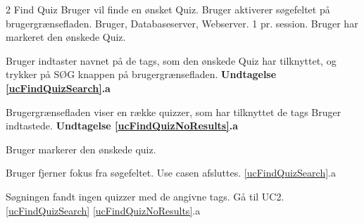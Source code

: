 \uchead
	{2}
	{Find Quiz}
	{Bruger vil finde en ønsket Quiz.}
	{Bruger aktiverer søgefeltet på brugergrænsefladen.}
	{Bruger, Databaseserver, Webserver.}
	{}
	{1 pr. session.}
	{Bruger har markeret den ønskede Quiz.}

\item \label{ucFindQuizSearch} Bruger indtaster navnet på de tags, som den ønskede Quiz har tilknyttet, og trykker på SØG knappen på brugergrænsefladen. 
\textbf{Undtagelse \ref{ucFindQuizSearch}.a}

\item \label{ucFindQuizNoResults} Brugergrænsefladen viser en række quizzer, som har tilknyttet de tags Bruger indtastede.
\textbf{Undtagelse \ref{ucFindQuizNoResults}.a}

\item Bruger markerer den ønskede quiz.

\ucdescriptionend

\ucextension
	{Bruger fjerner fokus fra søgefeltet.}
	{Use casen afsluttes.}
	{\ref{ucFindQuizSearch}.a}

\ucextension
	{Søgningen fandt ingen quizzer med de angivne tags.}
	{Gå til UC2.\ref{ucFindQuizSearch}}
	{\ref{ucFindQuizNoResults}.a}
				
